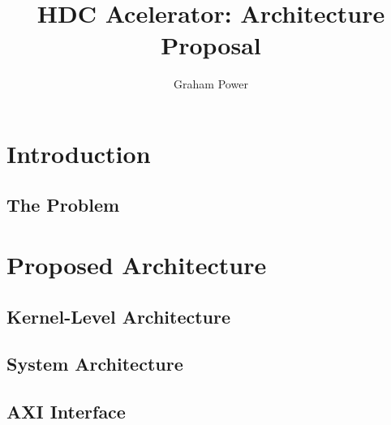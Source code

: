 \documentclass[11pt,oneside,a4paper]{article}
\begin{document}
\title{HDC Acelerator: Architecture Proposal}

\author{Graham Power}

\maketitle

\section{Introduction}

\subsection{The Problem}

\section{Proposed Architecture}

\subsection{Kernel-Level Architecture}

\subsection{System Architecture}

\subsection{AXI Interface}
\end{document}
